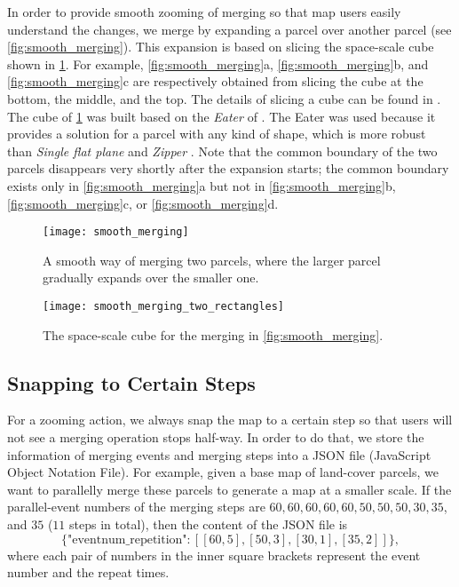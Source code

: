 \documentclass[ijgi,article,submit,moreauthors,pdftex]{Definitions/mdpi}
\begin{document}
In order to provide smooth zooming of merging
so that map users easily understand the changes,
we merge by expanding a parcel over another parcel
(see \fig\ref{fig:smooth_merging}).
This expansion is based on slicing the space-scale cube shown in
\fig\ref{fig:smooth_merging_two_rectangles}.
For example, \figs\ref{fig:smooth_merging}a,
\ref{fig:smooth_merging}b, and \ref{fig:smooth_merging}c
are respectively obtained from slicing the cube 
at the bottom, the middle, and the top.
The details of slicing a cube can be found in \citet{Meijers2020Web}.
The cube of \fig\ref{fig:smooth_merging_two_rectangles} was built 
based on the \emph{Eater} of \citet{Suba2014Merge}.
The Eater was used because it provides a solution 
for a parcel with any kind of shape, which is more robust than
\emph{Single flat plane} and \emph{Zipper} \citep{Suba2014Merge}.
Note that the common boundary of the two parcels disappears
very shortly after the expansion starts;
the common boundary exists only in \fig\ref{fig:smooth_merging}a but not in
\fig\ref{fig:smooth_merging}b,
\fig\ref{fig:smooth_merging}c, or
\fig\ref{fig:smooth_merging}d.


\begin{figure}[tb]
\centering
\texttt{[image: smooth\_merging]}
\caption{A smooth way of merging two parcels,
    where the larger parcel gradually expands over the smaller one.}
\label{fig:smooth_merging}
%
\vspace{6mm}
%
\centering
\texttt{[image: smooth\_merging\_two\_rectangles]}
\caption{The space-scale cube for the merging 
    in \fig\ref{fig:smooth_merging}.}
\label{fig:smooth_merging_two_rectangles}
\end{figure}




\subsection{Snapping to Certain Steps}
\label{sec:snap}

For a zooming action, 
we always snap the map to a certain step
so that users will not see a merging operation stops half-way.
In order to do that, we store the information of
merging events and merging steps into 
a JSON file (JavaScript Object Notation File).
For example, given a base map of land-cover parcels,
we want to parallelly merge these parcels to generate a map
at a smaller scale.
If the parallel-event numbers of the merging steps are 
$60, 60, 60, 60, 60, 50, 50, 50, 30, 35$, and $35$ ($11$ steps in total),
then the content of the JSON file is
$$
\{\textrm{"eventnum\_repetition"}: [[60, 5], [50, 3], [30, 1], [35, 2]]\},
$$
where each pair of numbers in the inner square brackets 
represent the event number and the repeat times.
\end{document}

